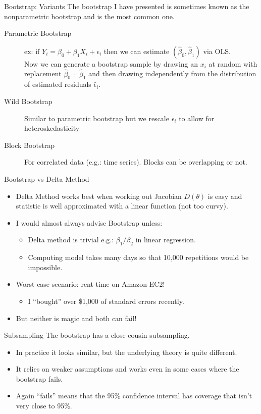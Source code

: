 \documentclass[aspectratio=169]{beamer}
\begin{document}
\begin{frame}{Bootstrap: Variants}
The bootstrap I have presented is sometimes known as the \alert{nonparametric bootstrap} and is the most common one.
\begin{description}
\item[Parametric Bootstrap] ex: if $Y_i = \beta_0 + \beta_1 X_i + \epsilon_i$ then we can estimate $(\hat{\beta}_0,\hat{\beta}_1)$ via OLS.\\
 Now we can generate a bootstrap sample by drawing an $x_i$ at random with replacement $\hat{\beta}_0 + \hat{\beta}_1$ and then drawing \alert{independently} from the distribution of estimated residuals $\hat{\epsilon}_i$.
 \item[Wild Bootstrap] Similar to parametric bootstrap but we rescale $\epsilon_i$ to allow for \alert{heteroskedasticity}
\item[Block Bootstrap] For correlated data (e.g.: time series). Blocks can be overlapping or not.  
\end{description}
\end{frame}

\begin{frame}{Bootstrap vs Delta Method}
\begin{itemize}
\item Delta Method works best when working out Jacobian $D(\theta)$ is easy and statistic is well approximated with a linear function (not too curvy).
\item I would almost always advise Bootstrap unless:
\begin{itemize}
\item Delta method is trivial e.g.: $\beta_1 / \beta_2$ in linear regression.
\item Computing model takes many days so that 10,000 repetitions would be impossible.
\end{itemize}
\item Worst case scenario: rent time on Amazon EC2!
\begin{itemize}
\item I ``bought'' over \$1,000 of standard errors recently.
\end{itemize}
\item But neither is magic and both can fail!
\end{itemize}
\end{frame}


\begin{frame}{Subsampling}
The bootstrap has a close cousin \alert{subsampling}.
\begin{itemize}
\item  In practice it looks similar, but the underlying theory is quite different.
\item It relies on weaker assumptions and works even in some cases where the bootstrap fails.
\item Again ``fails'' means that the 95\% confidence interval has coverage that isn't very close to 95\%.
\end{itemize}
\end{frame}
\end{document}

